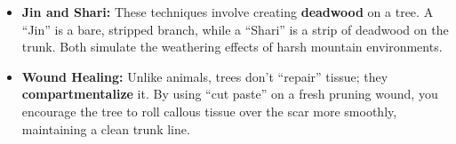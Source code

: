 {}
\begin{itemize}
    \item \textbf{Jin and Shari:} These techniques involve creating \textbf{deadwood} on a tree.
    A ``Jin'' is a bare, stripped branch, while a ``Shari'' is a strip of deadwood on the trunk.
    Both simulate the weathering effects of harsh mountain environments.




    \item \textbf{Wound Healing:} Unlike animals, trees don't ``repair'' tissue; they \textbf{compartmentalize} it.
    By using ``cut paste'' on a fresh pruning wound, you encourage the tree to roll callous tissue over the scar more smoothly, maintaining a clean trunk line.

\end{itemize}
\closearticle


\columnbreak
